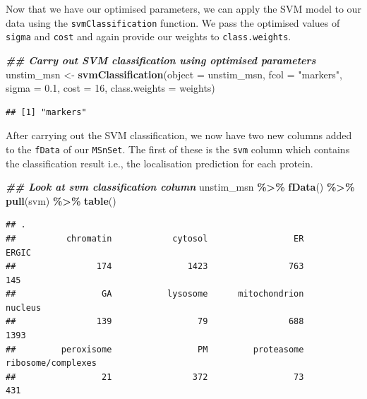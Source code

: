 \documentclass[9pt,a4paper,]{extarticle}
\newenvironment{Shaded}{\begin{snugshade}}{\end{snugshade}}
\newcommand{\AttributeTok}[1]{\textcolor[rgb]{0.13,0.29,0.53}{#1}}
\newcommand{\DecValTok}[1]{\textcolor[rgb]{0.00,0.00,0.81}{#1}}
\newcommand{\DocumentationTok}[1]{\textcolor[rgb]{0.56,0.35,0.01}{\textbf{\textit{#1}}}}
\newcommand{\FloatTok}[1]{\textcolor[rgb]{0.00,0.00,0.81}{#1}}
\newcommand{\FunctionTok}[1]{\textcolor[rgb]{0.13,0.29,0.53}{\textbf{#1}}}
\newcommand{\NormalTok}[1]{#1}
\newcommand{\OtherTok}[1]{\textcolor[rgb]{0.56,0.35,0.01}{#1}}
\newcommand{\SpecialCharTok}[1]{\textcolor[rgb]{0.81,0.36,0.00}{\textbf{#1}}}
\newcommand{\StringTok}[1]{\textcolor[rgb]{0.31,0.60,0.02}{#1}}
\begin{document}
Now that we have our optimised parameters, we can apply the SVM model to our
data using the \texttt{svmClassification} function. We pass the optimised values of
\texttt{sigma} and \texttt{cost} and again provide our weights to \texttt{class.weights}.

\begin{Shaded}
\begin{Highlighting}[]
\DocumentationTok{\#\# Carry out SVM classification using optimised parameters}
\NormalTok{unstim\_msn }\OtherTok{\textless{}{-}} \FunctionTok{svmClassification}\NormalTok{(}\AttributeTok{object =}\NormalTok{ unstim\_msn, }
                                \AttributeTok{fcol =} \StringTok{"markers"}\NormalTok{,}
                                \AttributeTok{sigma =} \FloatTok{0.1}\NormalTok{,}
                                \AttributeTok{cost =} \DecValTok{16}\NormalTok{, }
                                \AttributeTok{class.weights =}\NormalTok{ weights)}
\end{Highlighting}
\end{Shaded}

\begin{verbatim}
## [1] "markers"
\end{verbatim}

After carrying out the SVM classification, we now have two new columns added to
the \texttt{fData} of our \texttt{MSnSet}. The first of these is the \texttt{svm} column which contains
the classification result i.e., the localisation prediction for each protein.

\begin{Shaded}
\begin{Highlighting}[]
\DocumentationTok{\#\# Look at svm classification column}
\NormalTok{unstim\_msn }\SpecialCharTok{\%\textgreater{}\%}
  \FunctionTok{fData}\NormalTok{() }\SpecialCharTok{\%\textgreater{}\%}
  \FunctionTok{pull}\NormalTok{(svm) }\SpecialCharTok{\%\textgreater{}\%}
  \FunctionTok{table}\NormalTok{()}
\end{Highlighting}
\end{Shaded}

\begin{verbatim}
## .
##          chromatin            cytosol                 ER              ERGIC 
##                174               1423                763                145 
##                 GA           lysosome      mitochondrion            nucleus 
##                139                 79                688               1393 
##         peroxisome                 PM         proteasome ribosome/complexes 
##                 21                372                 73                431
\end{verbatim}
\end{document}
